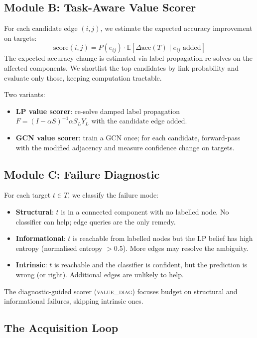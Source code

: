 \documentclass{article}
\begin{document}
\subsection{Module B: Task-Aware Value Scorer}

For each candidate edge $(i,j)$, we estimate the expected accuracy improvement on targets:
\begin{equation}
    \mathrm{score}(i,j) = P(e_{ij}) \cdot \mathbb{E}[\Delta \mathrm{acc}(T) \mid e_{ij} \text{ added}]
\end{equation}
The expected accuracy change is estimated via label propagation re-solves on the affected components.
We shortlist the top candidates by link probability and evaluate only those, keeping computation tractable.

Two variants:
\begin{itemize}
    \item \textbf{LP value scorer}: re-solve damped label propagation $F = (I - \alpha S)^{-1} \alpha S_L Y_L$ with the candidate edge added.
    \item \textbf{GCN value scorer}: train a GCN once; for each candidate, forward-pass with the modified adjacency and measure confidence change on targets.
\end{itemize}

\subsection{Module C: Failure Diagnostic}
\label{sec:diagnostic}

For each target $t \in T$, we classify the failure mode:
\begin{itemize}
    \item \textbf{Structural}: $t$ is in a connected component with no labelled node. No classifier can help; edge queries are the only remedy.
    \item \textbf{Informational}: $t$ is reachable from labelled nodes but the LP belief has high entropy (normalised entropy $> 0.5$). More edges may resolve the ambiguity.
    \item \textbf{Intrinsic}: $t$ is reachable and the classifier is confident, but the prediction is wrong (or right). Additional edges are unlikely to help.
\end{itemize}
The diagnostic-guided scorer (\textsc{value\_diag}) focuses budget on structural and informational failures, skipping intrinsic ones.


\subsection{The Acquisition Loop}
\end{document}
